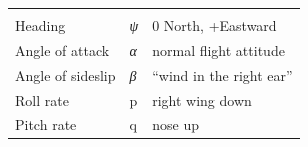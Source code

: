 \documentclass[
]{book}
\begin{document}
\begin{longtable}[]{@{}lll@{}}
\begin{minipage}[t]{0.23\columnwidth}
\end{minipage}\tabularnewline
\begin{minipage}[t]{0.56\columnwidth}\raggedright
Heading\strut
\end{minipage} & \begin{minipage}[t]{0.12\columnwidth}\raggedright
\emph{ψ}\strut
\end{minipage} & \begin{minipage}[t]{0.23\columnwidth}\raggedright
0 North, +Eastward\strut
\end{minipage}\tabularnewline
\begin{minipage}[t]{0.56\columnwidth}\raggedright
Angle of attack\strut
\end{minipage} & \begin{minipage}[t]{0.12\columnwidth}\raggedright
\emph{α}\strut
\end{minipage} & \begin{minipage}[t]{0.23\columnwidth}\raggedright
normal flight attitude\strut
\end{minipage}\tabularnewline
\begin{minipage}[t]{0.56\columnwidth}\raggedright
Angle of sideslip\strut
\end{minipage} & \begin{minipage}[t]{0.12\columnwidth}\raggedright
\emph{β}\strut
\end{minipage} & \begin{minipage}[t]{0.23\columnwidth}\raggedright
``wind in the right ear''\strut
\end{minipage}\tabularnewline
\begin{minipage}[t]{0.56\columnwidth}\raggedright
Roll rate\strut
\end{minipage} & \begin{minipage}[t]{0.12\columnwidth}\raggedright
p\strut
\end{minipage} & \begin{minipage}[t]{0.23\columnwidth}\raggedright
right wing down\strut
\end{minipage}\tabularnewline
\begin{minipage}[t]{0.56\columnwidth}\raggedright
Pitch rate\strut
\end{minipage} & \begin{minipage}[t]{0.12\columnwidth}\raggedright
q\strut
\end{minipage} & \begin{minipage}[t]{0.23\columnwidth}\raggedright
nose up\strut
\end{minipage}\tabularnewline

\end{longtable}
\end{document}
